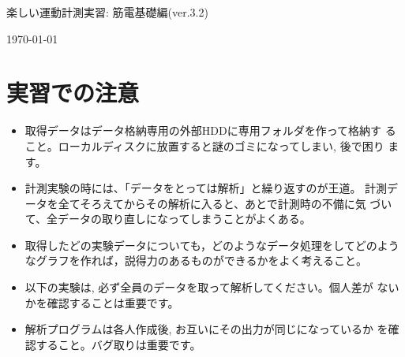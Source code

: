 \documentclass{jsarticle}
\def\version{3.2}
\begin{document}
\begin{center}
  {\LARGE 楽しい運動計測実習: 筋電基礎編(ver.\version)}
\end{center}
\begin{flushright}
\today
\end{flushright}

\section*{実習での注意}
\begin{itemize}
\item 取得データはデータ格納専用の外部HDDに専用フォルダを作って格納す
  ること。ローカルディスクに放置すると謎のゴミになってしまい, 後で困り
  ます。
\item 計測実験の時には、「データをとっては解析」と繰り返すのが王道。
  計測データを全てそろえてからその解析に入ると、あとで計測時の不備に気
  づいて、全データの取り直しになってしまうことがよくある。
\item 取得したどの実験データについても，どのようなデータ処理をしてどのようなグラフを作れば，説得力のあるものができるかをよく考えること。
\item 以下の実験は, 必ず全員のデータを取って解析してください。個人差が
  ないかを確認することは重要です。
\item 解析プログラムは各人作成後, お互いにその出力が同じになっているか
  を確認すること。バグ取りは重要です。
\end{itemize}

\end{document}
